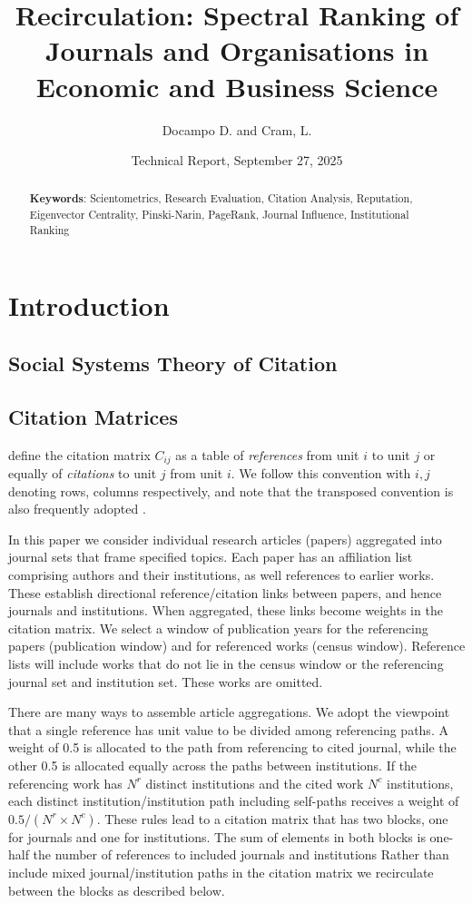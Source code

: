 \documentclass[10pt]{article}
\title{Recirculation: Spectral Ranking of Journals and Organisations in Economic and Business Science}
\date{Technical Report, September 27, 2025}
\author{Docampo D. and Cram, L.}
\begin{document}
\maketitle

\begin{abstract}

{\bfseries Keywords}: Scientometrics, Research Evaluation, Citation Analysis, Reputation, Eigenvector Centrality, Pinski-Narin, PageRank, Journal Influence, Institutional Ranking
 \end{abstract}
 
 


\section{Introduction}

\subsection{Social Systems Theory of Citation}

\subsection{Citation Matrices}

\cite{pinski} define the citation matrix $C_{ij}$ as a table of \textit{references}  from unit $i$ to unit $j$ or equally of \textit{citations} to unit $j$ from unit $i$. We follow this convention with $i, j$ denoting rows, columns respectively, and note that the transposed convention is also frequently adopted \cite[e.g. ][]{prathapPinskiNarinInfluence2019}.

In this paper we consider individual research articles (papers) aggregated into journal sets that frame specified topics. Each paper has an affiliation list comprising authors and their institutions, as well references to earlier works. These establish directional reference/citation links between papers, and hence journals and institutions. When aggregated, these links become weights in the citation matrix. We select a window of publication years for the referencing papers (publication window) and for referenced works (census window). Reference lists will include works that do not lie in the census window or the referencing journal set and institution set. These works are omitted.

There are many ways to assemble article aggregations. We adopt the viewpoint that a single reference has unit value to be divided among referencing paths. A weight of 0.5 is allocated to the path from referencing to cited journal, while the other 0.5 is allocated equally across the paths between institutions. If the referencing work has $N^r$ distinct institutions and the cited work $N^c$ institutions, each distinct institution/institution path including self-paths receives a weight of $0.5/(N^r \times N^c)$. These rules lead to a citation matrix that has two blocks, one for journals and one for institutions. The sum of elements in both blocks is one-half the number of references to included journals and institutions  Rather than include mixed journal/institution paths in the citation matrix we recirculate between the blocks as described below.        
\end{document}
